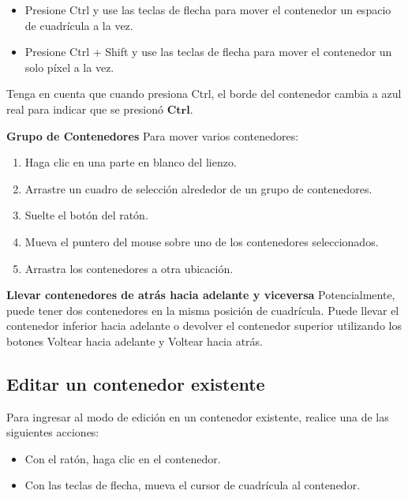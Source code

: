 \begin{itemize}
  \item Presione Ctrl y use las teclas de flecha para mover el contenedor un espacio de cuadrícula a la vez.

\item Presione Ctrl + Shift y use las teclas de flecha para mover el contenedor un solo píxel a la vez.
\end{itemize}

Tenga en cuenta que cuando presiona Ctrl, el borde del contenedor cambia a azul real para indicar que se presionó $\mathbf{C t r l}$.

\textbf{Grupo de Contenedores}
Para mover varios contenedores:

\begin{enumerate}
  \item Haga clic en una parte en blanco del lienzo.
 
 \item Arrastre un cuadro de selección alrededor de un grupo de contenedores.
 
 \item Suelte el botón del ratón.
 
 \item Mueva el puntero del mouse sobre uno de los contenedores seleccionados.
 
 \item Arrastra los contenedores a otra ubicación.

\end{enumerate}

\textbf{Llevar contenedores de atrás hacia adelante y viceversa}
Potencialmente, puede tener dos contenedores en la misma posición de cuadrícula. Puede llevar el contenedor inferior hacia adelante o devolver el contenedor superior utilizando los botones Voltear hacia adelante y Voltear hacia atrás.


\subsection{Editar un contenedor existente}
Para ingresar al modo de edición en un contenedor existente, realice una de las siguientes acciones:

\begin{itemize}
  \item Con el ratón, haga clic en el contenedor.

\item Con las teclas de flecha, mueva el cursor de cuadrícula al contenedor.
\end{itemize}

